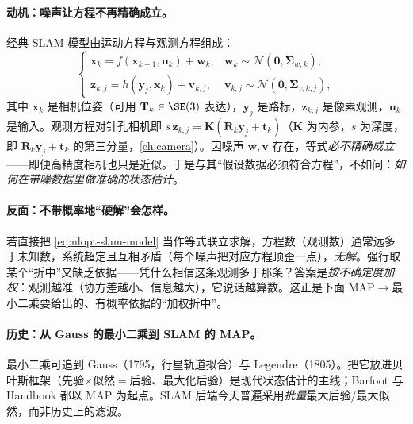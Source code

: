 \paragraph{动机：噪声让方程不再精确成立。}
经典 SLAM 模型由运动方程与观测方程组成\cite{gaoxiang2019slam14}：
\begin{equation}
  \begin{cases}
    \mathbf{x}_k=f(\mathbf{x}_{k-1},\mathbf{u}_k)+\mathbf{w}_k, & \mathbf{w}_k\sim\mathcal{N}(\mathbf{0},\boldsymbol{\Sigma}_{w,k}),\\
    \mathbf{z}_{k,j}=h(\mathbf{y}_j,\mathbf{x}_k)+\mathbf{v}_{k,j}, & \mathbf{v}_{k,j}\sim\mathcal{N}(\mathbf{0},\boldsymbol{\Sigma}_{v,k,j}),
  \end{cases}
  \label{eq:nlopt-slam-model}
\end{equation}
其中 $\mathbf{x}_k$ 是相机位姿（可用 $\mathbf{T}_k\in\SE(3)$ 表达），$\mathbf{y}_j$ 是路标，$\mathbf{z}_{k,j}$ 是像素观测，$\mathbf{u}_k$ 是输入。观测方程对针孔相机即 $s\,\mathbf{z}_{k,j}=\mathbf{K}(\mathbf{R}_k\mathbf{y}_j+\mathbf{t}_k)$（$\mathbf{K}$ 为内参，$s$ 为深度，即 $\mathbf{R}_k\mathbf{y}_j+\mathbf{t}_k$ 的第三分量，\cref{ch:camera}）。因噪声 $\mathbf{w},\mathbf{v}$ 存在，等式\emph{必不精确成立}——即便高精度相机也只是近似。于是与其“假设数据必须符合方程”，不如问：\emph{如何在带噪数据里做准确的状态估计}\cite{gaoxiang2019slam14}。

\paragraph{反面：不带概率地“硬解”会怎样。}
若直接把 \cref{eq:nlopt-slam-model} 当作等式联立求解，方程数（观测数）通常远多于未知数，系统超定且互相矛盾（每个噪声把对应方程顶歪一点），\emph{无解}。强行取某个“折中”又缺乏依据——凭什么相信这条观测多于那条？答案是\emph{按不确定度加权}：观测越准（协方差越小、信息越大），它说话越算数。这正是下面 MAP$\to$最小二乘要给出的、有概率依据的“加权折中”。

\paragraph{历史：从 Gauss 的最小二乘到 SLAM 的 MAP。}
最小二乘可追到 Gauss（1795，行星轨道拟合）与 Legendre（1805）。把它放进贝叶斯框架（先验$\times$似然$=$后验、最大化后验）是现代状态估计的主线；Barfoot\cite{barfoot2024state} 与 Handbook\cite{carlone2026handbook,dellaert2017factor} 都以 MAP 为起点。SLAM 后端今天普遍采用\emph{批量}最大后验/最大似然，而非历史上的滤波\cite{gaoxiang2019slam14}。


